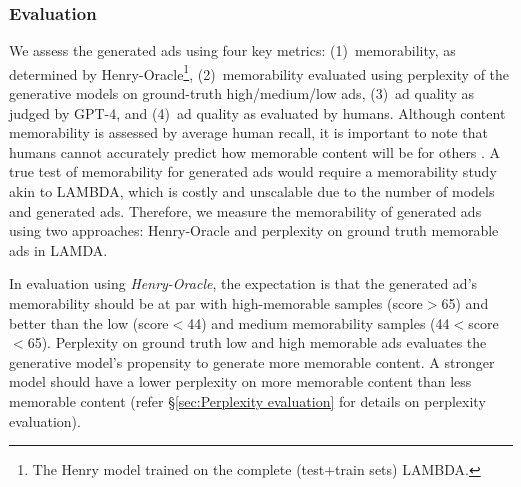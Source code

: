 \subsubsection{Evaluation} 
We assess the generated ads using four key metrics: (1)~memorability, as determined by Henry-Oracle\footnote{The Henry model trained on the complete (test+train sets) LAMBDA.}, (2)~memorability evaluated using perplexity of the generative models on ground-truth high/medium/low ads, (3)~ad quality as judged by GPT-4, and (4)~ad quality as evaluated by humans. Although content memorability is assessed by average human recall, it is important to note that humans cannot accurately predict how memorable content will be for others \cite{isola2013makes}. A true test of memorability for generated ads would require a memorability study akin to LAMBDA, which is costly and unscalable due to the number of models and generated ads. Therefore, we measure the memorability of generated ads using two approaches: Henry-Oracle and perplexity on ground truth memorable ads in LAMDA. 

In evaluation using \textit{Henry-Oracle}, the expectation is that the generated ad's memorability should be at par with high-memorable samples (score$>$65) and better than the low (score$<$44) and medium memorability samples (44$<$score$<$65). Perplexity on ground truth low and high memorable ads evaluates the generative model's propensity to generate more memorable content. A stronger model should have a lower perplexity on more memorable content than less memorable content (refer \S\ref{sec:Perplexity evaluation} for details on perplexity evaluation). 



